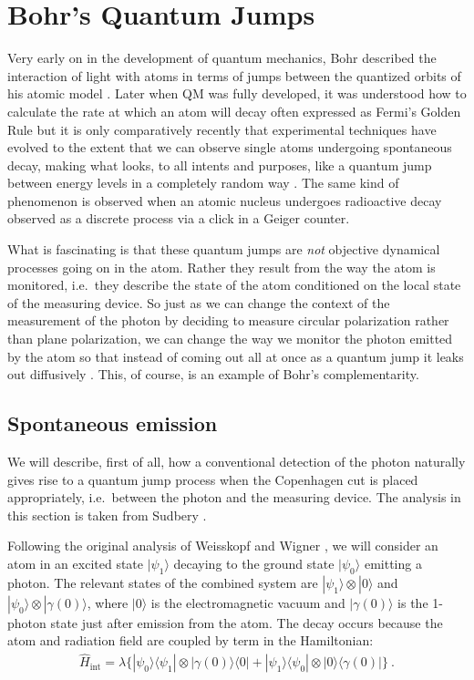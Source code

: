 \documentclass[12pt]{article}
\theoremstyle{plain}
\theoremstyle{definition}
\theoremstyle{remark}
\def\bra#1{\langle #1|}
\def\ket#1{| #1\rangle}
\newcommand{\EQ}[1]{\begin{equation}\begin{split} #1
\end{split}\end{equation}}
\begin{document}
\section{Bohr's Quantum Jumps}\label{s7}

Very early on in the development of quantum mechanics, Bohr described the interaction of light with atoms in terms of jumps between the quantized orbits of his atomic model \cite{BJump}. Later when QM was fully developed, it was understood how to calculate the rate at which an atom will decay often expressed as Fermi's Golden Rule but it is only comparatively recently that experimental techniques have evolved to the extent that we can observe single atoms undergoing spontaneous decay, making what looks, to all intents and purposes, like a quantum jump between energy levels in a completely random way \cite{NSD,SNBT,BHIW}. The same kind of phenomenon is observed when an atomic nucleus undergoes radioactive decay observed as a discrete process via a click in a Geiger counter.

What is fascinating is that these quantum jumps are {\it not\/} objective dynamical processes going on in the atom. Rather they result from the way the atom is monitored, i.e.~they describe the state of the atom conditioned on the local state of the measuring device. So just as we can change the context of the measurement of the photon by deciding to measure circular polarization rather than plane polarization, we can change the way we monitor the photon emitted by the atom so that instead of coming out all at once as a quantum jump it leaks out diffusively \cite{WG}. This, of course, is an example of Bohr's complementarity. 

\subsection{Spontaneous emission}\label{s7.1}

We will describe, first of all, how a conventional detection of the photon naturally gives rise to a quantum jump process when the Copenhagen cut is placed appropriately, i.e.~between the photon and the measuring device. The analysis in this section is taken from Sudbery \cite{Sud1}. 

Following the original analysis of Weisskopf and Wigner \cite{WW}, we will consider an atom in an excited state $\ket{\psi_1}$ decaying to the ground state $\ket{\psi_0}$ emitting a photon. The relevant states of the combined system are $\ket{\psi_1}\otimes\ket{0}$ and $\ket{\psi_0}\otimes\ket{\gamma(0)}$, where $\ket{0}$ is the electromagnetic vacuum and $\ket{\gamma(0)}$ is the 1-photon state just after emission from the atom. The decay occurs because the atom and radiation field are coupled by term in the Hamiltonian: 
\EQ{
\hat H_\text{int}=\lambda\Big\{\ket{\psi_0}\bra{\psi_1}\otimes\ket{\gamma(0)}\bra{0}+
\ket{\psi_1}\bra{\psi_0}\otimes\ket{0}\bra{\gamma(0)}\Big\}\ .
}
\end{document}
